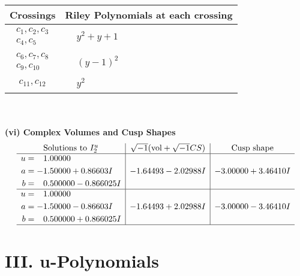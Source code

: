 \documentclass[1p]{elsarticle_modified}
\theoremstyle{definition}
\newcommand{\I}{\sqrt{-1}}
\begin{document}
\begin{tabular}{m{50pt}|m{274pt}}
Crossings & \hspace{64pt}Riley Polynomials at each crossing \\
\hline $$\begin{aligned}c_{1},c_{2},c_{3}\\c_{4},c_{5}\end{aligned}$$&$\begin{aligned}
&y^2+y+1
\end{aligned}$\\
\hline $$\begin{aligned}c_{6},c_{7},c_{8}\\c_{9},c_{10}\end{aligned}$$&$\begin{aligned}
&(y-1)^2
\end{aligned}$\\
\hline $$\begin{aligned}c_{11},c_{12}\end{aligned}$$&$\begin{aligned}
&y^2
\end{aligned}$\\
\hline
\end{tabular}\\~\\
\newpage\flushleft \textbf{(vi) Complex Volumes and Cusp Shapes}
$$\begin{array}{c|c|c}  
\text{Solutions to }I^u_{2}& \I (\text{vol} + \sqrt{-1}CS) & \text{Cusp shape}\\
 \hline 
\begin{aligned}
u &= \phantom{-}1.00000\phantom{ +0.000000I} \\
a &= -1.50000 + 0.86603 I \\
b &= \phantom{-}0.500000 - 0.866025 I\end{aligned}
 & -1.64493 - 2.02988 I & -3.00000 + 3.46410 I \\ \hline\begin{aligned}
u &= \phantom{-}1.00000\phantom{ +0.000000I} \\
a &= -1.50000 - 0.86603 I \\
b &= \phantom{-}0.500000 + 0.866025 I\end{aligned}
 & -1.64493 + 2.02988 I & -3.00000 - 3.46410 I\\
 \hline 
 \end{array}$$\newpage
\newpage\renewcommand{\arraystretch}{1}
\centering \section*{ III. u-Polynomials}
\end{document}
